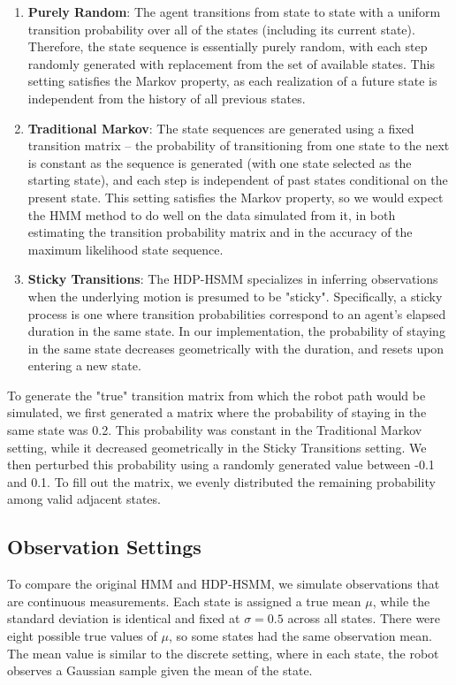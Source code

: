 \documentclass{article}
\begin{document}
\begin{enumerate}
	\item \textbf{Purely Random}: The agent transitions from state to state with a uniform transition probability over all of the states (including its current state). Therefore, the state sequence is essentially purely random, with each step randomly generated with replacement from the set of available states. This setting satisfies the Markov property, as each realization of a future state is independent from the history of all previous states.
	\item \textbf{Traditional Markov}: The state sequences are generated using a fixed transition matrix -- the probability of transitioning from one state to the next is constant as the sequence is generated (with one state selected as the starting state), and each step is independent of past states conditional on the present state. This setting satisfies the Markov property, so we would expect the HMM method to do well on the data simulated from it, in both estimating the transition probability matrix and in the accuracy of the maximum likelihood state sequence.
	\item \textbf{Sticky Transitions}: The HDP-HSMM specializes in inferring observations when the underlying motion is presumed to be "sticky". Specifically, a sticky process is one where transition probabilities correspond to an agent's elapsed duration in the same state. In our implementation, the probability of staying in the same state decreases geometrically with the duration, and resets upon entering a new state.
 \end{enumerate}

To generate the "true" transition matrix from which the robot path would be simulated, we first generated a matrix where the probability of staying in the same state was 0.2. This probability was constant in the Traditional Markov setting, while it decreased geometrically in the Sticky Transitions setting. We then perturbed this probability using a randomly generated value between -0.1 and 0.1. To fill out the matrix, we evenly distributed the remaining probability among valid adjacent states.

\subsection{Observation Settings}

To compare the original HMM and HDP-HSMM, we simulate observations that are continuous measurements. Each state is assigned a true mean $\mu$, while the standard deviation is identical and fixed at $\sigma = 0.5$ across all states. There were eight possible true values of $\mu$, so some states had the same observation mean. The mean value is similar to the discrete setting, where in each state, the robot observes a Gaussian sample given the mean of the state.
\end{document}
